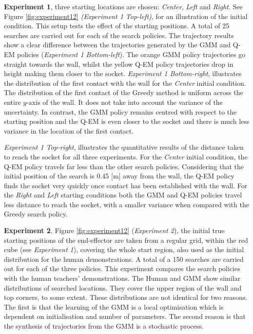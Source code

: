 \documentclass[final,5p,times,twocolumn]{elsarticle}
\begin{document}
\textbf{Experiment 1}, three starting locations are chosen: \textit{Center}, \textit{Left} and \textit{Right}. 
See Figure \ref{fig:experiment12} \textit{(Experiment 1 Top-left)}, for an illustration of the initial condition. 
This setup tests the effect of the starting positions. A total of 25 searches are carried out for each of the search policies.
The trajectory results show a clear difference between the trajectories generated by the GMM and Q-EM policies (\textit{Experiment 1 Bottom-left}). 
The orange GMM policy trajectories go straight towards the wall, whilst the yellow Q-EM policy trajectories drop in height 
making them closer to the socket. 
\textit{Experiment 1 Bottom-right}, illustrates the distribution of the first contact with the wall for the \textit{Center} initial 
condition. The distribution of the first contact of the Greedy method is uniform across the entire $y$-axis of the wall. 
It does not take into account the variance of the uncertainty. In contrast, the GMM policy remains centred 
with respect to the starting position and the Q-EM is even closer to the socket and there is much less variance in 
the location of the first contact.

\textit{Experiment 1 Top-right}, illustrates the quantitative results of the distance taken to reach the socket for 
all three experiments. For the \textit{Center} initial condition, the Q-EM policy travels far less than the other search policies. 
Considering that the initial position of the search is 0.45 [m] away from the wall, the Q-EM policy finds the socket very 
quickly once contact has been established with the wall. For the \textit{Right} and \textit{Left} starting conditions both 
the GMM and Q-EM policies travel less distance to reach the socket, with a smaller variance when compared with the Greedy search policy.

\textbf{Experiment 2}, Figure \ref{fig:experiment12} (\textit{Experiment 2}), the initial true starting positions 
of the end-effector are taken from a regular grid, within the red cube (see \textit{Experiment 1}), covering the whole start region, also used as the initial distribution for 
the human demonstrations. A total of a 150 searches are carried out for each of the three policies. 
This experiment compares the search policies with the human teachers' demonstrations. 
The Human and GMM show similar distributions of searched locations. They cover the upper region of the wall and top corners, to some extent. These distributions 
are not identical for two reasons. The first is that the learning of the GMM is a local optimisation 
which is dependent on initialisation and number of parameters. The second reason is that the synthesis of trajectories 
from the GMM is a stochastic process. 
\end{document}
